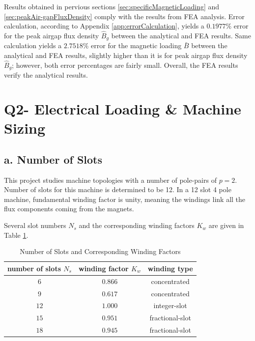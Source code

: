 \documentclass[a4paper, 11pt, titlepage]{article}
\begin{document}
Results obtained in pervious sections \ref{sec:specificMagneticLoading} and \ref{sec:peakAir-gapFluxDensity} comply with the results from FEA analysis. Error calculation, according to Appendix \ref{app:errorCalculation}, yields a $0.1977\%$ error for the peak airgap flux density $\hat{B}_g$ between the analytical and FEA results. Same calculation yields a $2.7518\%$ error for the magnetic loading $\bar{B}$ between the analytical and FEA results, slightly higher than it is for peak airgap flux density $\hat{B}_g$; however, both error percentages are fairly small. Overall, the FEA results verify the analytical results.

\section{Q2- Electrical Loading \& Machine Sizing}
\label{sec:Q2}

\subsection{a. Number of Slots}

This project studies machine topologies with a number of pole-pairs of $p=2$. Number of slots for this machine is determined to be 12. In a 12 slot 4 pole machine, fundamental winding factor is unity, meaning the windings link all the flux components coming from the magnets.

Several slot numbers $N_s$ and the corresponding winding factors $K_w$ are given in Table \ref{fig:NsvsKw}.

\begin{table}[h]
	\begin{center}
		\begin{tabular}{c|c|c}
			number of slots $N_s$ & winding factor $K_w$ & winding type \\
			\hline
			$6$ & $0.866$ & concentrated \\
			\hline
			$9$ & $0.617$ & concentrated \\
			\hline
			$12$ & $1.000$ & integer-slot \\
			\hline
			$15$ & $0.951$ & fractional-slot \\
			\hline
			$18$ & $0.945$ & fractional-slot \\
			\hline
		\end{tabular}
	\end{center}
	\caption{Number of Slots and Corresponding Winding Factors}
	\label{fig:NsvsKw}
\end{table}
\end{document}
